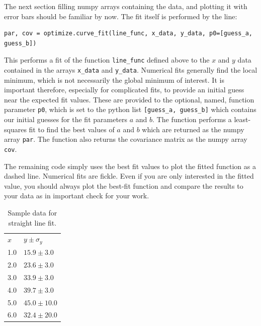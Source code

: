 The next section filling numpy arrays containing the data, and
plotting it with error bars should be familiar by now.  The fit itself
is performed by the line:
\begin{verbatim}
par, cov = optimize.curve_fit(line_func, x_data, y_data, p0=[guess_a, guess_b])
\end{verbatim}
This performs a fit of the function {\tt line{\_}func} defined above
to the $x$ and $y$ data contained in the arrays {\tt x{\_}data} and
{\tt y{\_}data}.  Numerical fits generally find the local minimum,
which is not necessarily the global minimum of interest.  It is
important therefore, especially for complicated fits, to provide an
initial guess near the expected fit values.  These are provided to the
optional, named, function parameter {\tt p0}, which is set to the
python list {\tt [guess{\_}a, guess{\_}b]} which contains our initial guesses for
the fit parameters $a$ and $b$.  The function performs a least-squares
fit to find the best values of $a$ and $b$ which are returned as the
numpy array {\tt par}.  The function also returns the covariance
matrix as the numpy array {\tt cov}.

The remaining code simply uses the best fit values to plot the fitted
function as a dashed line.  Numerical fits are fickle.  Even if you
are only interested in the fitted value, you should always plot the
best-fit function and compare the results to your data as in important
check for your work.

\begin{table}
\caption{Sample data for straight line fit.}
\label{tbl:linesamp}
\begin{center}
\begin{tabular}{ll}
$x$ & $y \pm \sigma_y$ \\
1.0  & $15.9 \pm 3.0$ \\
2.0  & $23.6 \pm 3.0$ \\
3.0  & $33.9 \pm 3.0$ \\
4.0  & $39.7 \pm 3.0$ \\
5.0  & $45.0 \pm 10.0$ \\
6.0  & $32.4 \pm 20.0$ \\
\end{tabular}
\end{center}
\end{table}


